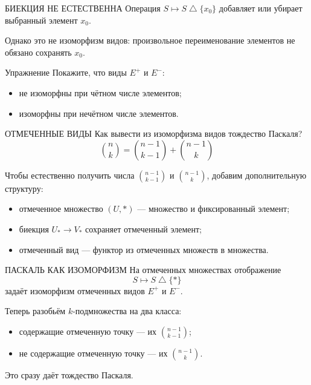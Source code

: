 \documentclass[aspectratio=169,11pt]{beamer}
\begin{document}
\begin{cttextframe}{БИЕКЦИЯ НЕ ЕСТЕСТВЕННА}
Операция $S\mapsto S\mathbin{\triangle}\{x_0\}$ добавляет или убирает
выбранный элемент $x_0$.

Однако это не изоморфизм видов: произвольное переименование элементов
не обязано сохранять $x_0$.
\\[.5cm]
\begin{block}{Упражнение}
Покажите, что виды $E^+$ и $E^-$:
\begin{itemize}
  \item не изоморфны при чётном числе элементов;
  \item изоморфны при нечётном числе элементов.
\end{itemize}
\end{block}
\end{cttextframe}


\begin{cttextframe}{ОТМЕЧЕННЫЕ ВИДЫ}
Как вывести из изоморфизма видов тождество Паскаля?
\[
  \binom nk=\binom{n-1}{k-1}+\binom{n-1}k
\]

Чтобы естественно получить числа $\binom{n-1}{k-1}$ и
$\binom{n-1}k$, добавим дополнительную структуру:
\begin{itemize}
  \item отмеченное множество $(U,\ast)$ — множество и фиксированный элемент;
  \item биекция $U_\ast\to V_\ast$ сохраняет отмеченный элемент;
  \item отмеченный вид — функтор из отмеченных множеств в множества.
\end{itemize}
\end{cttextframe}

\begin{cttextframe}{ПАСКАЛЬ КАК ИЗОМОРФИЗМ}
На отмеченных множествах отображение
\[
  S\longmapsto S\mathbin{\triangle}\{\ast\}
\]
задаёт изоморфизм отмеченных видов $E^+$ и $E^-$.

Теперь разобьём $k$-подмножества на два класса:
\begin{itemize}
  \item содержащие отмеченную точку — их $\binom{n-1}{k-1}$;
  \item не содержащие отмеченную точку — их $\binom{n-1}{k}$.
\end{itemize}

Это сразу даёт тождество Паскаля.
\end{cttextframe}
\end{document}
